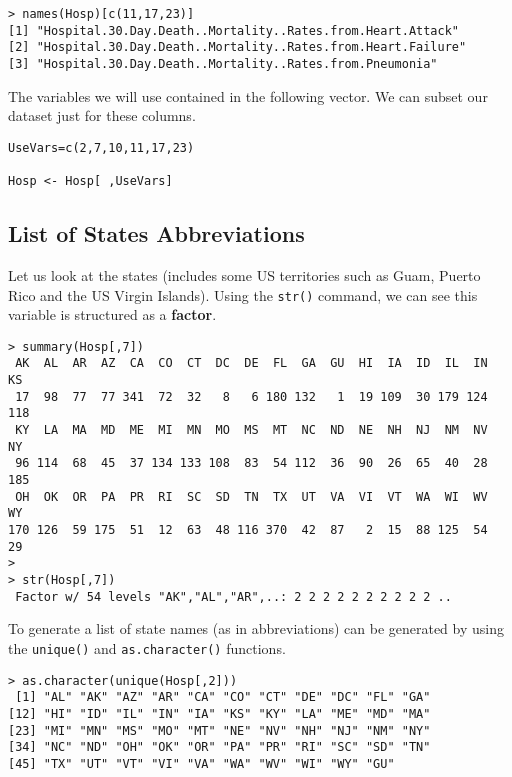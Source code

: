 \documentclass[]{article}
\begin{document}
\begin{verbatim}
> names(Hosp)[c(11,17,23)]
[1] "Hospital.30.Day.Death..Mortality..Rates.from.Heart.Attack" 
[2] "Hospital.30.Day.Death..Mortality..Rates.from.Heart.Failure"
[3] "Hospital.30.Day.Death..Mortality..Rates.from.Pneumonia" 
\end{verbatim}

The variables we will use contained in the following vector. We can subset our dataset just for these columns.

\begin{framed}
\begin{verbatim}
UseVars=c(2,7,10,11,17,23)

Hosp <- Hosp[ ,UseVars]
\end{verbatim}
\end{framed}

\newpage
\subsection{List of States Abbreviations}
\noindent Let us look at the states (includes some US territories such as Guam, Puerto Rico and the US Virgin Islands). Using the \texttt{str()} command, we can see this variable is structured as a \textbf{factor}.
\begin{verbatim}
> summary(Hosp[,7])
 AK  AL  AR  AZ  CA  CO  CT  DC  DE  FL  GA  GU  HI  IA  ID  IL  IN  KS 
 17  98  77  77 341  72  32   8   6 180 132   1  19 109  30 179 124 118 
 KY  LA  MA  MD  ME  MI  MN  MO  MS  MT  NC  ND  NE  NH  NJ  NM  NV  NY 
 96 114  68  45  37 134 133 108  83  54 112  36  90  26  65  40  28 185 
 OH  OK  OR  PA  PR  RI  SC  SD  TN  TX  UT  VA  VI  VT  WA  WI  WV  WY 
170 126  59 175  51  12  63  48 116 370  42  87   2  15  88 125  54  29
>
> str(Hosp[,7])
 Factor w/ 54 levels "AK","AL","AR",..: 2 2 2 2 2 2 2 2 2 2 ..
\end{verbatim}

To generate a list of state names (as in abbreviations) can be generated by using the \texttt{unique()} and \texttt{as.character()} functions.
\begin{verbatim}
> as.character(unique(Hosp[,2]))
 [1] "AL" "AK" "AZ" "AR" "CA" "CO" "CT" "DE" "DC" "FL" "GA"
[12] "HI" "ID" "IL" "IN" "IA" "KS" "KY" "LA" "ME" "MD" "MA"
[23] "MI" "MN" "MS" "MO" "MT" "NE" "NV" "NH" "NJ" "NM" "NY"
[34] "NC" "ND" "OH" "OK" "OR" "PA" "PR" "RI" "SC" "SD" "TN"
[45] "TX" "UT" "VT" "VI" "VA" "WA" "WV" "WI" "WY" "GU"

\end{verbatim}
\end{document}
